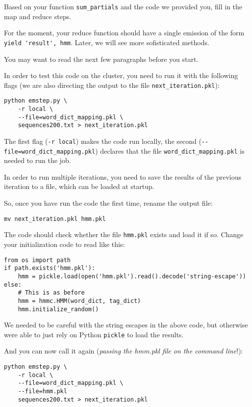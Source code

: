 \begin{exercise}
Based on your function \verb+sum_partials+ and the code we provided you, fill in
the map and reduce steps.

For the moment, your reduce function should have a single emission of the form
\verb+yield 'result', hmm+. Later, we will see more sofisticated methods.

You may want to read the next few paragraphs before you start.
\end{exercise}

In order to test this code on the cluster, you need to run it with the
following flags (we are also directing the output to the file
\verb+next_iteration.pkl+):

\begin{verbatim}
python emstep.py \
    -r local \
    --file=word_dict_mapping.pkl \
    sequences200.txt > next_iteration.pkl
\end{verbatim}

The first flag (\verb+-r local+) makes the code run locally, the second
(\verb+--file=word_dict_mapping.pkl+) declares that the file
\verb+word_dict_mapping.pkl+ is needed to run the job.

In order to run multiple iterations, you need to save the results of the
previous iteration to a file, which can be loaded at startup.

So, once you have run the code the first time, rename the output file:

\begin{verbatim}
mv next_iteration.pkl hmm.pkl
\end{verbatim}

The code should check whether the file \verb+hmm.pkl+ exists and load it if so.
Change your initialization code to read like this:

\begin{verbatim}
from os import path
if path.exists('hmm.pkl'):
    hmm = pickle.load(open('hmm.pkl').read().decode('string-escape'))
else:
    # This is as before
    hmm = hmmc.HMM(word_dict, tag_dict)
    hmm.initialize_random()
\end{verbatim}

We needed to be careful with the string escapes in the above code, but
otherwise were able to just rely on Python \verb+pickle+ to load the results.

And you can now call it again (\emph{passing the hmm.pkl file on the command
line}!):

\begin{verbatim}
python emstep.py \
    -r local \
    --file=word_dict_mapping.pkl \
    --file=hmm.pkl
    sequences200.txt > next_iteration.pkl
\end{verbatim}

